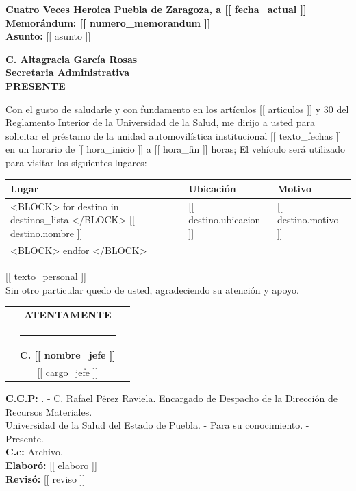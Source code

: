 \documentclass[12pt]{article}
\begin{document}
\begin{flushright}
  {\small \textbf{Cuatro Veces Heroica Puebla de Zaragoza, a [[ fecha_actual ]]}} \\
  {\small \textbf{Memorándum: [[ numero_memorandum ]]}} \\
  {\small \textbf{Asunto:} [[ asunto ]]}
\end{flushright}

\vspace{0.3cm}

\textbf{C. Altagracia García Rosas} \\
\textbf{Secretaria Administrativa} \\

\vspace{0.3cm}
\textbf{PRESENTE}
\vspace{0.3cm}

Con el gusto de saludarle y con fundamento en los artículos [[ articulos ]] y 30 del Reglamento Interior de la Universidad de la Salud, me dirijo a usted para solicitar el préstamo de la unidad automovilística institucional [[ texto_fechas ]] en un horario de [[ hora_inicio ]] a [[ hora_fin ]] horas; El vehículo será utilizado para visitar los siguientes lugares:

\vspace{0.2cm}
{\small
\begin{tabular}{|p{3.5cm}|p{7cm}|p{4cm}|}
\hline
\textbf{Lugar} & \textbf{Ubicación} & \textbf{Motivo} \\ \hline
<BLOCK> for destino in destinos_lista </BLOCK>
[[ destino.nombre ]] & [[ destino.ubicacion ]] & [[ destino.motivo ]] \\ \hline
<BLOCK> endfor </BLOCK>
\end{tabular}
}
\vspace{0.2cm}

[[ texto_personal ]] \\
Sin otro particular quedo de usted, agradeciendo su atención y apoyo.

\vspace{0.7cm}

\noindent\begin{tabular*}{\textwidth}{@{\extracolsep{\fill}}ccc}
& \textbf{ATENTAMENTE} & \\ [6ex]
& \rule{5cm}{0.4pt} & \\
& \textbf{C. [[ nombre_jefe ]]} & \\
& [[ cargo_jefe ]] & \\
\end{tabular*}

\vspace{0.8cm}

\small \textbf{C.C.P:} . - C. Rafael Pérez Raviela. Encargado de Despacho de la Dirección de Recursos Materiales.\\
\small Universidad de la Salud del Estado de Puebla. - Para su conocimiento. - Presente.\\
\small \textbf{C.c:} Archivo.\\
\textbf{Elaboró:} [[ elaboro ]] \\
\textbf{Revisó:} [[ reviso ]]
\end{document}
